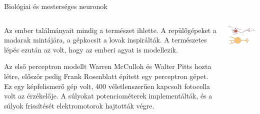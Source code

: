 \documentclass[english, aspectratio=169]{beamer}
\begin{document}
\begin{frame}{Biológiai és mesterséges neuronok}
\begin{columns}
\begin{column}{.5\textwidth}
Az ember találmányait mindig a természet ihlette. A repülőgépeket a madarak mintájára, a gépkocsit a lovak inspirálták. A természetes lépés ezután az volt, hogy az emberi agyat is modellezik.\par\medskip
Az első perceptron modellt Warren McCulloh és Walter Pitts hozta létre, először pedig Frank Rosenblatt épített egy perceptron gépet. Ez egy képfelismerő gép volt, 400 véletlenszerűen kapcsolt fotocella volt az érzékelője. A súlyokat potenciométerek implementálták, és a súlyok frissítését elektromotorok hajtották végre. 
\end{column}
\begin{column}{.5\textwidth}
\begin{center}
\includegraphics[width=7cm, keepaspectratio]{images/dl_1.png}
\end{center}
\end{column}
\end{columns}
\end{frame}
\end{document}
